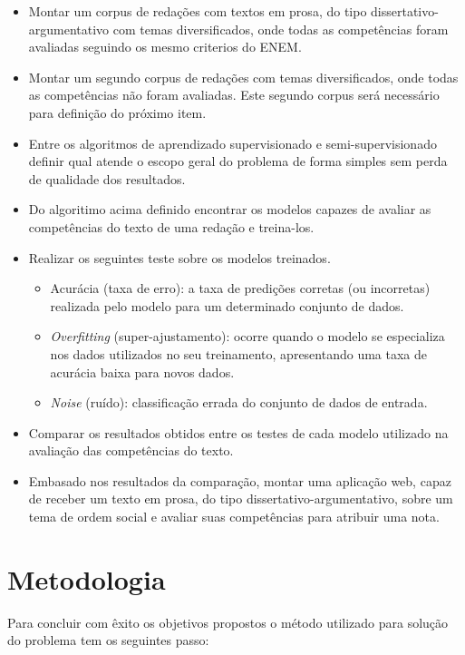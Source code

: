 \begin{itemize}
 \item Montar um corpus de redações com textos em prosa, do tipo dissertativo-argumentativo com temas diversificados, onde todas as competências foram avaliadas seguindo os mesmo criterios do ENEM.
 \item Montar um segundo corpus de redações com temas diversificados, onde todas as competências não foram avaliadas. Este segundo corpus será necessário para definição do próximo item.
 \item Entre os algoritmos de aprendizado supervisionado e semi-supervisionado definir qual atende o escopo geral do problema de forma simples sem perda de qualidade dos resultados.
 \item Do algoritimo acima definido encontrar os modelos capazes de avaliar as competências do texto de uma redação e treina-los.
 \item Realizar os seguintes teste sobre os modelos treinados.
  \begin{itemize}
   \item Acurácia (taxa de erro): a taxa de predições corretas (ou incorretas) realizada pelo modelo para um determinado conjunto de dados.
   \item \textit{Overfitting} (super-ajustamento): ocorre quando o modelo se especializa nos dados utilizados no seu treinamento, apresentando uma taxa de acurácia baixa para novos dados.
   \item \textit{Noise} (ruído): classificação errada do conjunto de dados de entrada.
  \end{itemize}
 \item Comparar os resultados obtidos entre os testes de cada modelo utilizado na avaliação das competências do texto.
 \item Embasado nos resultados da comparação, montar uma aplicação web, capaz de receber um texto em prosa, do tipo dissertativo-argumentativo, sobre um tema de ordem social e avaliar suas competências para atribuir uma nota. 
\end{itemize}

\newpage
\section{Metodologia}

Para concluir com êxito os objetivos propostos o método utilizado para solução do problema tem os seguintes passo:

